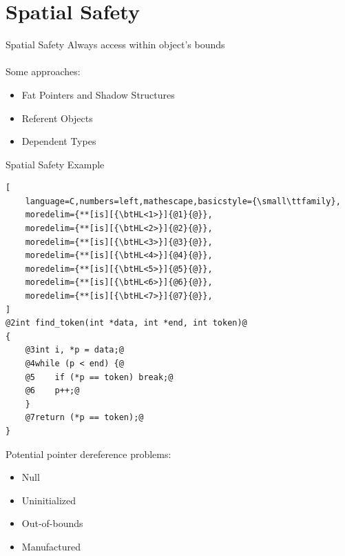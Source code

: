 \documentclass[aspectratio=169]{beamer}
\begin{document}


\section{Spatial Safety}

\begin{frame}{Spatial Safety}
Always access within object's \alert{bounds}
\\
\pause
\vspace{0.2in}
\\
Some approaches:
\begin{itemize}
      \item Fat Pointers and Shadow Structures
      \item Referent Objects
      \item Dependent Types
  \end{itemize}
\end{frame}

\begin{frame}[fragile]{Spatial Safety Example}
\footnotesize
\begin{lstlisting}[
    language=C,numbers=left,mathescape,basicstyle={\small\ttfamily},
    moredelim={**[is][{\btHL<1>}]{@1}{@}},
    moredelim={**[is][{\btHL<2>}]{@2}{@}},
    moredelim={**[is][{\btHL<3>}]{@3}{@}},
    moredelim={**[is][{\btHL<4>}]{@4}{@}},
    moredelim={**[is][{\btHL<5>}]{@5}{@}},
    moredelim={**[is][{\btHL<6>}]{@6}{@}},
    moredelim={**[is][{\btHL<7>}]{@7}{@}},
]
@2int find_token(int *data, int *end, int token)@
{
    @3int i, *p = data;@
    @4while (p < end) {@
    @5    if (*p == token) break;@
    @6    p++;@
    }
    @7return (*p == token);@
}
\end{lstlisting}


\footnotesize{
Potential pointer dereference problems:
  \begin{itemize}
      \item Null
      \item Uninitialized
      \item Out-of-bounds 
      \item Manufactured 
  \end{itemize}
}
\end{frame}
\end{document}
